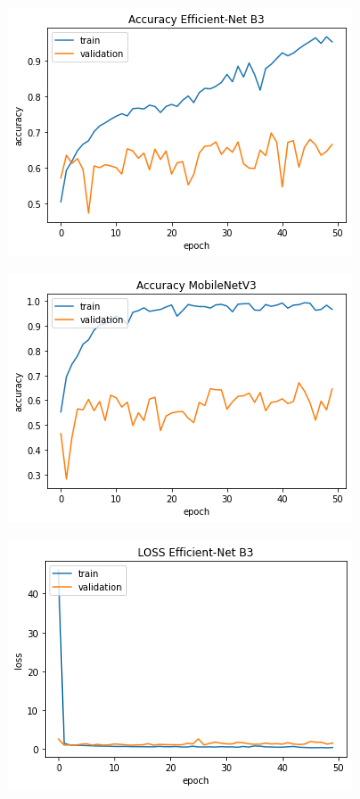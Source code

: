 \documentclass[11pt]{report}
\begin{document}
\begin{figure}[h]
\centering
	\begin{subfigure}[t]{.45\textwidth}
	\centering
    \includegraphics[scale = 0.5]{img/Acc-EffNet.png}
	\end{subfigure}
	\quad
	\begin{subfigure}[t]{.45\textwidth}
	\centering
    \includegraphics[scale = 0.5]{img/Acc-MobileNet.png}
	\end{subfigure}
	\quad
	\begin{subfigure}[t]{.45\textwidth}
	\centering
    \includegraphics[scale = 0.5]{img/Loss-effnet.png}

\end{subfigure}
\end{figure}
\end{document}
